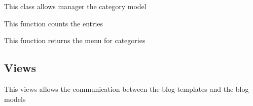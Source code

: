 \documentclass[letterpaper,10pt,english]{sphinxmanual}
\begin{document}

\begin{fulllineitems}
\label{modules/blog:apps.blog.models.CategoryManager}
This class allows manager the category model

\begin{fulllineitems}
\label{modules/blog:apps.blog.models.CategoryManager.countEntries}
This function counts the entries

\end{fulllineitems}


\begin{fulllineitems}
\label{modules/blog:apps.blog.models.CategoryManager.menuCategory}
This function returns the menu for categories

\end{fulllineitems}


\end{fulllineitems}



\subsection{Views}
\label{modules/blog:views}
This views allows the communication between the blog templates and the blog models
\label{modules/blog:module-apps.blog.views}
\end{document}
